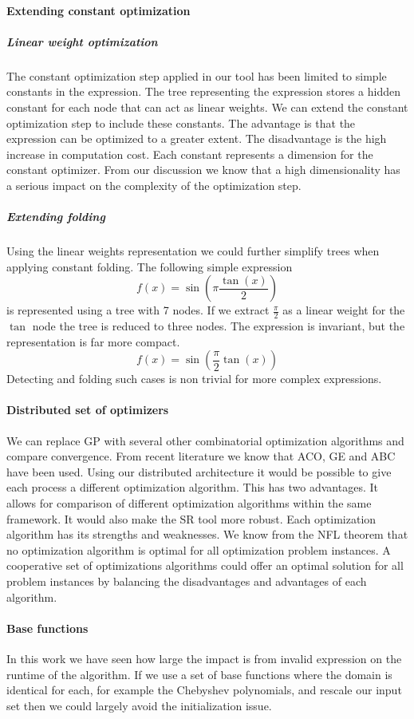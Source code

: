 \paragraph{Extending constant optimization}
\subparagraph{Linear weight optimization}
The constant optimization step applied in our tool has been limited to simple constants in the expression. The tree representing the expression stores a hidden constant for each node that can act as linear weights. We can extend the constant optimization step to include these constants. The advantage is that the expression can be optimized to a greater extent. The disadvantage is the high increase in computation cost. Each constant represents a dimension for the constant optimizer. From our discussion we know that a high dimensionality has a serious impact on the complexity of the optimization step.
\subparagraph{Extending folding}
Using the linear weights representation we could further simplify trees when applying constant folding. The following simple expression
\[
f(x) = \sin( \pi \frac{\tan(x)}{2})
\]
is represented using a tree with 7 nodes. If we extract $\frac{\pi}{2}$ as a linear weight for the $\tan$ node the tree is reduced to three nodes. The expression is invariant, but the representation is far more compact.
\[
f(x) = \sin( \frac{\pi}{2} \tan(x))
\]
Detecting and folding such cases is non trivial for more complex expressions.

\paragraph{Distributed set of optimizers}
We can replace GP with several other combinatorial optimization algorithms and compare convergence. From recent literature we know that ACO, GE and ABC have been used. Using our distributed architecture it would be possible to give each process a different optimization algorithm. This has two advantages. It allows for comparison of different optimization algorithms within the same framework. It would also make the SR tool more robust. Each optimization algorithm has its strengths and weaknesses. We know from the NFL theorem that no optimization algorithm is optimal for all optimization problem instances. A cooperative set of optimizations algorithms could offer an optimal solution for all problem instances by balancing the disadvantages and advantages of each algorithm.

\paragraph{Base functions}
In this work we have seen how large the impact is from invalid expression on the runtime of the algorithm. If we use a set of base functions where the domain is identical for each, for example the Chebyshev polynomials, and rescale our input set then we could largely avoid the initialization issue.

